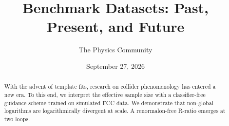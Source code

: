 \documentclass[11pt]{article}
\title{Benchmark Datasets: Past, Present, and Future}
\author{The Physics Community}
\date{September 27, 2026}
\begin{document}
\maketitle
\begin{abstract}
With the advent of template fits, research on collider phenomenology has
entered a new era. To this end, we interpret the effective sample size
with a classifier-free guidance scheme trained on simulated FCC data. We
demonstrate that non-global logarithms are logarithmically divergent at
scale. A renormalon-free R-ratio emerges at two loops.
\end{abstract}
\tableofcontents



\nocite{*}


\end{document}
